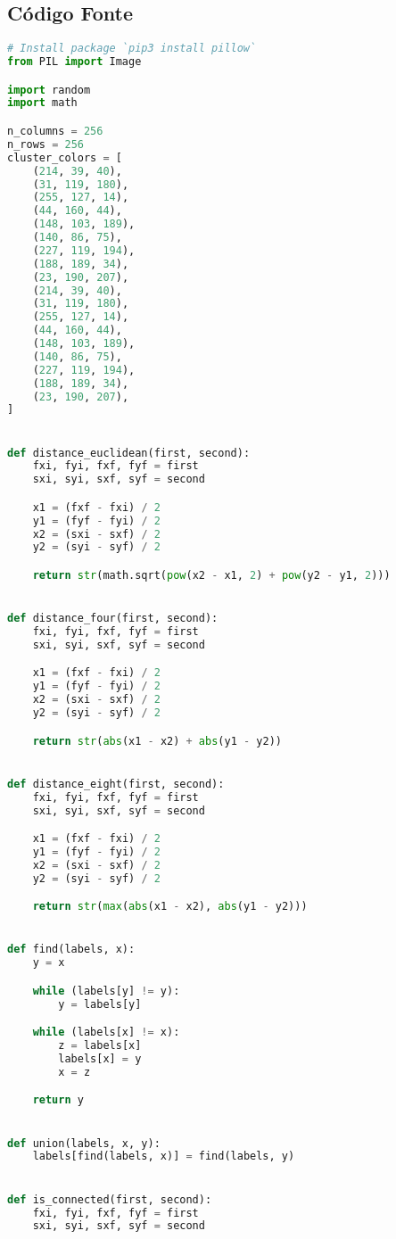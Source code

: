 \documentclass{article}
\begin{document}
\subsection{Código Fonte}

\begin{lstlisting}[language=Python]
# Install package `pip3 install pillow`
from PIL import Image

import random
import math

n_columns = 256
n_rows = 256
cluster_colors = [
    (214, 39, 40),
    (31, 119, 180),
    (255, 127, 14),
    (44, 160, 44),
    (148, 103, 189),
    (140, 86, 75),
    (227, 119, 194),
    (188, 189, 34),
    (23, 190, 207),
    (214, 39, 40),
    (31, 119, 180),
    (255, 127, 14),
    (44, 160, 44),
    (148, 103, 189),
    (140, 86, 75),
    (227, 119, 194),
    (188, 189, 34),
    (23, 190, 207),
]


def distance_euclidean(first, second):
    fxi, fyi, fxf, fyf = first
    sxi, syi, sxf, syf = second

    x1 = (fxf - fxi) / 2
    y1 = (fyf - fyi) / 2
    x2 = (sxi - sxf) / 2
    y2 = (syi - syf) / 2 

    return str(math.sqrt(pow(x2 - x1, 2) + pow(y2 - y1, 2)))


def distance_four(first, second):
    fxi, fyi, fxf, fyf = first
    sxi, syi, sxf, syf = second

    x1 = (fxf - fxi) / 2
    y1 = (fyf - fyi) / 2
    x2 = (sxi - sxf) / 2
    y2 = (syi - syf) / 2

    return str(abs(x1 - x2) + abs(y1 - y2))


def distance_eight(first, second):
    fxi, fyi, fxf, fyf = first
    sxi, syi, sxf, syf = second

    x1 = (fxf - fxi) / 2
    y1 = (fyf - fyi) / 2
    x2 = (sxi - sxf) / 2
    y2 = (syi - syf) / 2

    return str(max(abs(x1 - x2), abs(y1 - y2)))


def find(labels, x):
    y = x

    while (labels[y] != y):
        y = labels[y]

    while (labels[x] != x):
        z = labels[x]
        labels[x] = y
        x = z

    return y


def union(labels, x, y):
    labels[find(labels, x)] = find(labels, y)


def is_connected(first, second):
    fxi, fyi, fxf, fyf = first
    sxi, syi, sxf, syf = second


\end{lstlisting}
\end{document}
